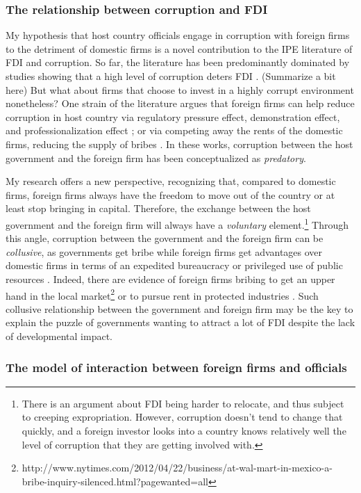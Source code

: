 \subsubsection{The relationship between corruption and FDI}

My hypothesis that host country officials engage in corruption with foreign firms to the detriment of domestic firms is a novel contribution to the IPE literature of FDI and corruption. So far, the literature has been predominantly dominated by studies showing that a high level of corruption deters FDI \citep{Wei2000, Hakkala2008, Al-Sadig2009}. (Summarize a bit here) But what about firms that choose to invest in a highly corrupt environment nonetheless? One strain of the literature argues that foreign firms can help reduce corruption in host country via regulatory pressure effect, demonstration effect, and professionalization effect \citep{Kwok2006}; or via competing away the rents of the domestic firms, reducing the supply of bribes \citep{Sandholtz2003}. In these works, corruption between the host government and the foreign firm has been conceptualized as \textit{predatory}.

My research offers a new perspective, recognizing that, compared to domestic firms, foreign firms always have the freedom to move out of the country or at least stop bringing in capital. Therefore, the exchange between the host government and the foreign firm will always have a \textit{voluntary} element.\footnote{There is an argument about FDI being harder to relocate, and thus subject to creeping expropriation. However, corruption doesn't tend to change that quickly, and a foreign investor looks into a country knows relatively well the level of corruption that they are getting involved with.} Through this angle, corruption between the government and the foreign firm can be \textit{collusive}, as governments get bribe while foreign firms get advantages over domestic firms in terms of an expedited bureaucracy or privileged use of public resources \citep{Hellman2002}. Indeed, there are evidence of foreign firms bribing to get an upper hand in the local market\footnote{http://www.nytimes.com/2012/04/22/business/at-wal-mart-in-mexico-a-bribe-inquiry-silenced.html?pagewanted=all} or to pursue rent in protected industries \citep{Malesky2015}. Such collusive relationship between the government and foreign firm may be the key to explain the puzzle of governments wanting to attract a lot of FDI despite the lack of developmental impact.

\subsubsection{The model of interaction between foreign firms and officials}

